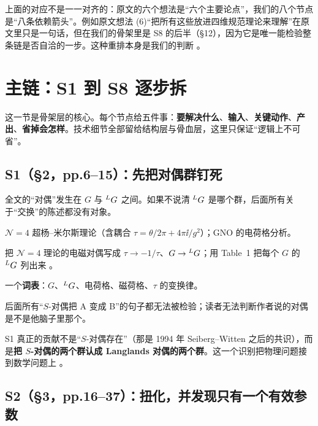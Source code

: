 \begin{warn}
上面的对应不是一一对齐的：原文的六个想法是“六个主要论点”，我们的八个节点是“八条依赖箭头”。例如原文想法 (6)“把所有这些放进四维规范理论来理解”在原文里只是一句话，但在我们的骨架里是 S8 的后半（\S12），因为它是唯一能检验整条链是否自洽的一步。这种重排本身是我们的判断 \pC。
\end{warn}

\section{主链：S1 到 S8 逐步拆}

这一节是骨架层的核心。每个节点给五件事：\textbf{要解决什么}、\textbf{输入}、\textbf{关键动作}、\textbf{产出}、\textbf{省掉会怎样}。技术细节全部留给结构层与骨血层，这里只保证“逻辑上不可省”。

\subsection{S1（\S2，pp.6--15）：先把对偶群钉死}

\begin{description}[leftmargin=1.4em]
\item[要解决什么] 全文的“对偶”发生在 $G$ 与 ${}^{L}G$ 之间。如果不说清 ${}^{L}G$ 是哪个群，后面所有关于“交换”的陈述都没有对象。
\item[输入] $\mathcal{N}=4$ 超杨--米尔斯理论（含耦合 $\tau=\theta/2\pi+4\pi\ii/g^2$）；GNO 的电荷格分析。
\item[关键动作] 把 $\mathcal{N}=4$ 理论的电磁对偶写成 $\tau\to-1/\tau$、$G\to{}^{L}G$；用 Table~1 把每个 $G$ 的 ${}^{L}G$ 列出来 。
\item[产出] 一个\textbf{词表}：$G$、${}^{L}G$、电荷格、磁荷格、$\tau$ 的变换律。
\item[省掉会怎样] 后面所有“$S$-对偶把 A 变成 B”的句子都无法被检验；读者无法判断作者说的对偶是不是他脑子里那个。
\end{description}

\begin{keyidea}
S1 真正的贡献不是“$S$-对偶存在”（那是 1994 年 Seiberg--Witten 之后的共识），而是\textbf{把 $S$-对偶的两个群认成 Langlands 对偶的两个群}。这一个识别把物理问题接到数学问题上 \pA。
\end{keyidea}

\subsection{S2（\S3，pp.16--37）：扭化，并发现只有一个有效参数}


